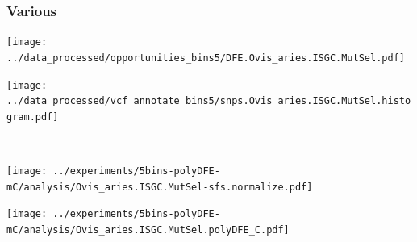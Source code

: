 \subsubsection{Various}

\begin{minipage}{0.49\linewidth}
    \texttt{[image: ../data\_processed/opportunities\_bins5/DFE.Ovis\_aries.ISGC.MutSel.pdf]}
\end{minipage}
\begin{minipage}{0.49\linewidth}
    \texttt{[image: ../data\_processed/vcf\_annotate\_bins5/snps.Ovis\_aries.ISGC.MutSel.histogram.pdf]}
\end{minipage}
\\
\begin{minipage}{0.49\linewidth}
    \texttt{[image: ../experiments/5bins-polyDFE-mC/analysis/Ovis\_aries.ISGC.MutSel-sfs.normalize.pdf]}
\end{minipage}
\begin{minipage}{0.4\linewidth}
    \texttt{[image: ../experiments/5bins-polyDFE-mC/analysis/Ovis\_aries.ISGC.MutSel.polyDFE\_C.pdf]}
\end{minipage}
